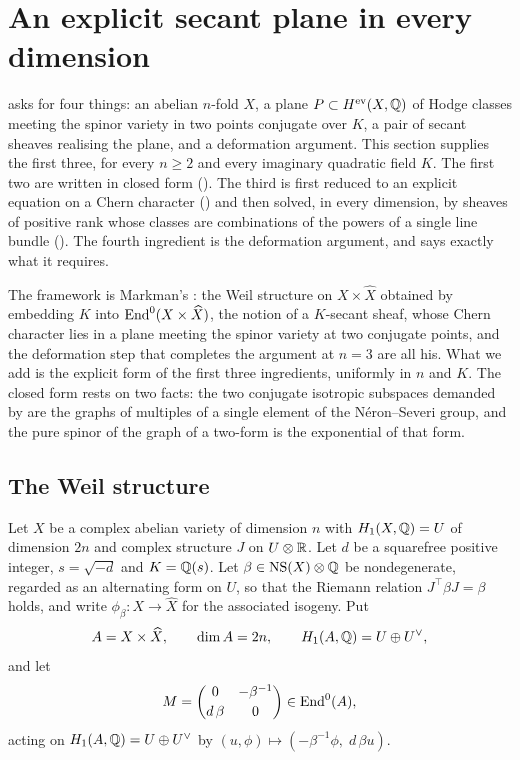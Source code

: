 \section{An explicit secant plane in every dimension}\label{sec:construction}

 asks for four things: an abelian $n$-fold $X$, a plane
$P\subset H^{\mathrm{ev}}(X,\mathbb{Q})$ of Hodge classes meeting the spinor variety
in two points conjugate over $K$, a pair of secant sheaves realising the
plane, and a deformation argument. This section supplies the first three, for
every $n\ge2$ and every imaginary quadratic field $K$. The first two are
written in closed form (). The third is first
reduced to an explicit equation on a Chern character
() and then solved, in every dimension, by sheaves
of positive rank whose classes are combinations of the powers of a single line
bundle (). The fourth ingredient is the deformation
argument, and  says exactly what it requires.

The framework is Markman's \cite{Mar25a,Mar25b}: the Weil structure on
$X\times\widehat{X}$ obtained by embedding $K$ into
$\operatorname{End}^{0}(X\times\widehat{X})$, the notion of a $K$-secant sheaf, whose Chern
character lies in a plane meeting the spinor variety at two conjugate points,
and the deformation step that completes the argument at $n=3$ are all his.
What we add is the explicit form of the first three ingredients, uniformly in
$n$ and $K$. The closed form rests on two facts: the two conjugate isotropic
subspaces demanded by  are the graphs of multiples of
a single element of the N\'eron--Severi group, and the pure spinor of the graph
of a two-form is the exponential of that form.

\subsection{The Weil structure}

\begin{setupenv}\label{setup:construction}
Let $X$ be a complex abelian variety of dimension $n$ with
$H_{1}(X,\mathbb{Q})=U$ of dimension $2n$ and complex structure $J$ on
$U\otimes\mathbb{R}$. Let $d$ be a squarefree positive integer, $s=\sqrt{-d}$ and
$K=\mathbb{Q}(s)$. Let $\beta\in\mathrm{NS}(X)\otimes\mathbb{Q}$ be nondegenerate, regarded as an
alternating form on $U$, so that the Riemann relation $J^{\top}\beta J=\beta$
holds, and write $\phi_{\beta}\colon X\to\widehat{X}$ for the associated
isogeny. Put
\[
  A=X\times\widehat{X},\qquad \dim A=2n,\qquad
  H_{1}(A,\mathbb{Q})=U\oplus U^{\vee},
\]
and let
\begin{equation}\label{eq:Mdef}
  M=\begin{pmatrix}0 & -\beta^{-1}\\[2pt] d\,\beta & 0\end{pmatrix}
  \in\operatorname{End}^{0}(A),
\end{equation}
acting on $H_{1}(A,\mathbb{Q})=U\oplus U^{\vee}$ by
$(u,\phi)\mapsto(-\beta^{-1}\phi,\;d\,\beta u)$.
\end{setupenv}

